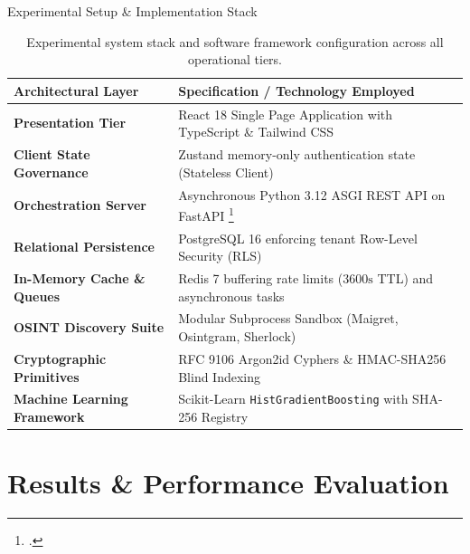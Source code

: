 \documentclass[aspectratio=169,10pt]{beamer}
\begin{document}
\begin{frame}{Experimental Setup \& Implementation Stack}
  \begin{table}
    \centering
    \footnotesize
    \begin{tabular}{>{\raggedright\arraybackslash}p{4.2cm} >{\raggedright\arraybackslash}p{7.8cm}}
      \toprule
      \textbf{Architectural Layer} & \textbf{Specification / Technology Employed} \\
      \midrule
      \textbf{Presentation Tier} & React 18 Single Page Application with TypeScript \& Tailwind CSS \\
      \textbf{Client State Governance} & Zustand memory-only authentication state (Stateless Client) \\
      \textbf{Orchestration Server} & Asynchronous Python 3.12 ASGI REST API on FastAPI \footcite{fastapi2025} \\
      \textbf{Relational Persistence} & PostgreSQL 16 enforcing tenant Row-Level Security (RLS) \\
      \textbf{In-Memory Cache \& Queues} & Redis 7 buffering rate limits ($3600\text{s}$ TTL) and asynchronous tasks \\
      \textbf{OSINT Discovery Suite} & Modular Subprocess Sandbox (Maigret, Osintgram, Sherlock) \\
      \textbf{Cryptographic Primitives} & RFC 9106 Argon2id Cyphers \& HMAC-SHA256 Blind Indexing \\
      \textbf{Machine Learning Framework} & Scikit-Learn \texttt{HistGradientBoosting} with SHA-256 Registry \\
      \bottomrule
    \end{tabular}
    \caption{Experimental system stack and software framework configuration across all operational tiers.}
  \end{table}
\end{frame}

\section{Results \& Performance Evaluation}
\end{document}
